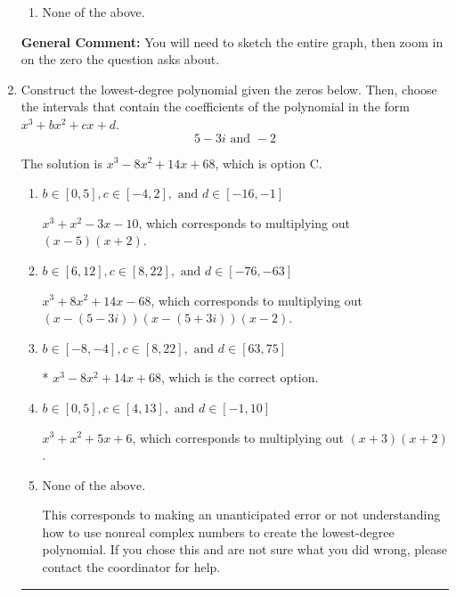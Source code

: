 \documentclass{extbook}[14pt]
\newcommand{\litem}[1]{\item #1

\rule{\textwidth}{0.4pt}}
\begin{document}
\begin{enumerate}
{\begin{enumerate}[label=\Alph*.]
\item None of the above.\end{enumerate}
\textbf{General Comment:} You will need to sketch the entire graph, then zoom in on the zero the question asks about.
}
\litem{
Construct the lowest-degree polynomial given the zeros below. Then, choose the intervals that contain the coefficients of the polynomial in the form $x^3+bx^2+cx+d$.
\[ 5 - 3 i \text{ and } -2 \]

The solution is \( x^{3} -8 x^{2} +14 x + 68 \), which is option C.\begin{enumerate}[label=\Alph*.]
\item \( b \in [0, 5], c \in [-4, 2], \text{ and } d \in [-16, -1] \)

$x^{3} + x^{2} -3 x -10$, which corresponds to multiplying out $(x -5)(x + 2)$.
\item \( b \in [6, 12], c \in [8, 22], \text{ and } d \in [-76, -63] \)

$x^{3} +8 x^{2} +14 x -68$, which corresponds to multiplying out $(x-(5 - 3 i))(x-(5 + 3 i))(x -2)$.
\item \( b \in [-8, -4], c \in [8, 22], \text{ and } d \in [63, 75] \)

* $x^{3} -8 x^{2} +14 x + 68$, which is the correct option.
\item \( b \in [0, 5], c \in [4, 13], \text{ and } d \in [-1, 10] \)

$x^{3} + x^{2} +5 x + 6$, which corresponds to multiplying out $(x + 3)(x + 2)$.
\item \( \text{None of the above.} \)

This corresponds to making an unanticipated error or not understanding how to use nonreal complex numbers to create the lowest-degree polynomial. If you chose this and are not sure what you did wrong, please contact the coordinator for help.
\end{enumerate}

}
\end{enumerate}
\end{document}
